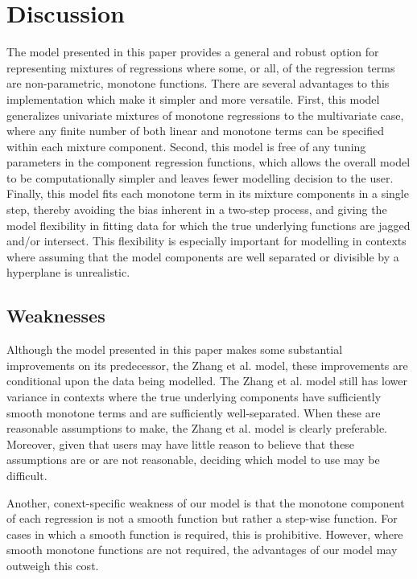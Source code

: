\documentclass[10pt]{olplainarticle}\usepackage[]{graphicx}\usepackage[]{color}
\begin{document}
\section{Discussion}

The model presented in this paper provides a general and robust option for representing mixtures of regressions where some, or all, of the regression terms are non-parametric, monotone functions. There are several advantages to this implementation which make it simpler and more versatile. First, this model generalizes univariate mixtures of monotone regressions to the multivariate case, where any finite number of both linear and monotone terms can be specified within each mixture component. Second, this model is free of any tuning parameters in the component regression functions, which allows the overall model to be computationally simpler and leaves fewer modelling decision to the user. Finally, this model fits each monotone term in its mixture components in a single step, thereby avoiding the bias inherent in a two-step process, and giving the model flexibility in fitting data for which the true underlying functions are jagged and/or intersect. This flexibility is especially important for modelling in contexts where assuming that the model components are well separated or divisible by a hyperplane is unrealistic.


\subsection{Weaknesses}

Although the model presented in this paper makes some substantial improvements on its predecessor, the Zhang et al. model, these improvements are conditional upon the data being modelled. The Zhang et al. model still has lower variance in contexts where the true underlying components have sufficiently smooth monotone terms and are sufficiently well-separated. When these are reasonable assumptions to make, the Zhang et al. model is clearly preferable. Moreover, given that users may have little reason to believe that these assumptions are or are not reasonable, deciding which model to use may be difficult.

Another, conext-specific weakness of our model is that the monotone component of each regression is not a smooth function but rather a step-wise function. For cases in which a smooth function is required, this is prohibitive. However, where smooth monotone functions are not required, the advantages of our model may outweigh this cost.
\end{document}
